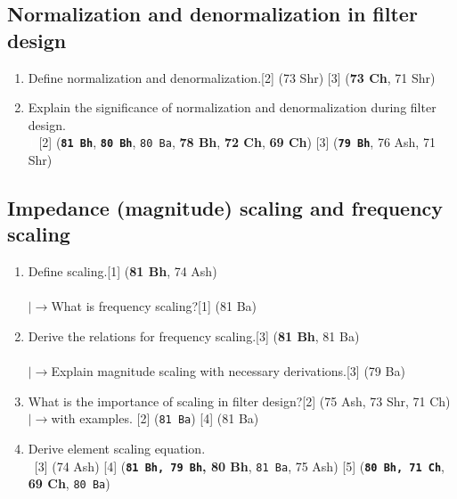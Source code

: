\documentclass[12pt]{article}
\newcommand{\lb}{\\$\left|\rightarrow\right.$}
\newcommand{\enter}{\\\textcolor{white}{1}}
\begin{document}
	\subsection{Normalization and denormalization in filter design}
	\begin{enumerate}
	\item Define normalization and denormalization.\hfill[2] (73 Shr) [3] (\textbf{73 Ch}, 71 Shr)
	\item Explain the significance of normalization and denormalization during filter design.\\
	\textcolor{white}{1} \hfill [2] (\textbf{\texttt{81 Bh}}, \textbf{\texttt{80 Bh}}, \texttt{80 Ba}, \textbf{78 Bh}, \textbf{72 Ch}, \textbf{69 Ch}) [3] (\textbf{\texttt{79 Bh}}, 76 Ash, 71 Shr)
	\end{enumerate}
	\subsection{Impedance (magnitude) scaling and frequency scaling}
	\begin{enumerate}
	\item Define scaling.\hfill[1] (\textbf{81 Bh}, 74 Ash)\\
	\lb What is frequency scaling?\hfill[1] (81 Ba)
	\item Derive the relations for frequency scaling.\hfill[3] (\textbf{81 Bh}, 81 Ba) \\
	\lb  Explain magnitude scaling with necessary derivations.\hfill[3] (79 Ba)
	\item What is the importance of scaling in filter design?\hfill[2] (75 Ash, 73 Shr, 71 Ch)
	\lb  with examples. \hfill[2] (\texttt{81 Ba}) [4] (81 Ba)
	\item Derive element scaling equation.
	\enter \hfill [3] (74 Ash) [4] (\textbf{\texttt{81 Bh, 79 Bh}, 80 Bh}, \texttt{81 Ba}, 75 Ash) [5] (\textbf{\texttt{80 Bh, 71 Ch}}, \textbf{69 Ch}, \texttt{80 Ba})
	\end{enumerate}
\end{document}
